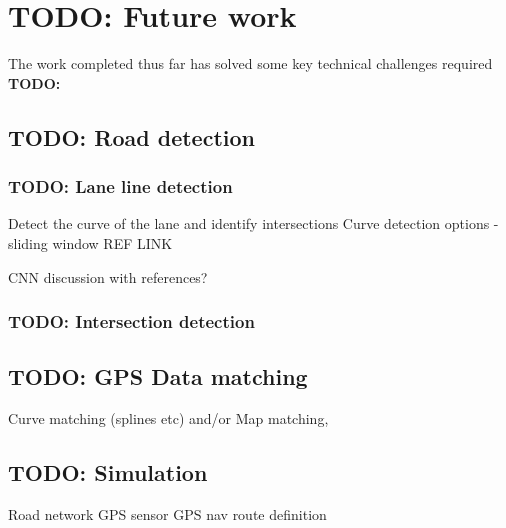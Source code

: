 \documentclass[]{aiaa-tc}%
\begin{document}
\section{TODO: Future work}

The work completed thus far has solved some key technical challenges required \textbf{TODO: }

\subsection{TODO: Road detection}

\subsubsection{TODO: Lane line detection}

Detect the curve of the lane and identify intersections
Curve detection options - sliding window REF LINK %

CNN discussion with references?

\subsubsection{TODO: Intersection detection}

\subsection{TODO: GPS Data matching}
Curve matching (splines etc) and/or Map matching, 

\subsection{TODO: Simulation}

Road network
GPS sensor
GPS nav route definition
\end{document}
